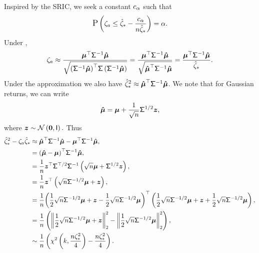 \documentclass[10pt,a4paper,english]{article}
\theoremstyle{plain}
\theoremstyle{definition}
\theoremstyle{remark}
\providecommand{\cono}[1][\typeI]{\mathSUB{c}{#1}}
\providecommand{\pqlUL}[3]{\funcitUL{q}{#1}{#2}{#3}}
\providecommand{\pql}[1]{\pqlUL{}{}{#1}}
\begin{document}
Inspired by the SRIC, we seek a constant $\cono[{\typeI}]$ such that
\begin{equation}
  \Pr{\psnr[a] \le \ssropt - \frac{\cono[{\typeI}]}{\ssiz\ssropt}} = \typeI.
  \label{eqn:psnr_ci_bound}
\end{equation}
Under ,
\begin{equation}
  \psnr[a] 
  \approx
  \frac{\tr{\pvmu}\minv{\pvsig}\svmu}{\sqrt{\qform{\pvsig}{\wrapParens{\minv{\pvsig}\svmu}}}}
  = \frac{\tr{\pvmu}\minv{\pvsig}\svmu}{\sqrt{\qiform{\pvsig}{\svmu}}}
  = \frac{\tr{\pvmu}\minv{\pvsig}\svmu}{\ssropt}.
\end{equation}
Under the approximation we also have $\ssrsqopt\approx\qiform{\pvsig}{\svmu}$.
We note that for Gaussian returns, we can write
\begin{equation*}
  \svmu = \pvmu + \oneby{\sqrt{\ssiz}}\chol{\pvsig}\vect{z},
\end{equation*}
where $\vect{z} \sim\normlaw{\vzero,\eye}.$
Thus
\begin{align*}
  \ssrsqopt - \psnr[a]\ssropt 
  & \approx 
  \qiform{\pvsig}{\svmu} - \tr{\pvmu}\minv{\pvsig}\svmu,\\
  &=
  \tr{\wrapParens{\svmu-\pvmu}}\minv{\pvsig}\svmu,\\
  &=
  \oneby{\ssiz}
  \tr{\vect{z}}\trchol{\pvsig}
  \minv{\pvsig}
  \wrapParens{\sqrt{\ssiz}\pvmu + \chol{\pvsig}\vect{z}},\\
  &=
  \oneby{\ssiz}
  \tr{\vect{z}}
  \wrapParens{\sqrt{\ssiz}\ichol{\pvsig}\pvmu + \vect{z}},\\
  &=
  \oneby{\ssiz}
  \tr{\wrapParens{\half\sqrt{\ssiz}\ichol{\pvsig}\pvmu + \vect{z} - \half\sqrt{\ssiz}\ichol{\pvsig}\pvmu}}
     \wrapParens{\half\sqrt{\ssiz}\ichol{\pvsig}\pvmu + \vect{z} + \half\sqrt{\ssiz}\ichol{\pvsig}\pvmu},\\
  &=
  \oneby{\ssiz}\wrapParens{
    \norm{\half\sqrt{\ssiz}\ichol{\pvsig}\pvmu + \vect{z}}^2
    - \norm{\half\sqrt{\ssiz}\ichol{\pvsig}\pvmu}^2},\\
  &\sim
  \oneby{\ssiz}\wrapParens{\chisqlaw{\nstrat,\frac{\ssiz\psnrsqopt}{4}} - \frac{\ssiz\psnrsqopt}{4}}.
\end{align*}%
\end{document}
